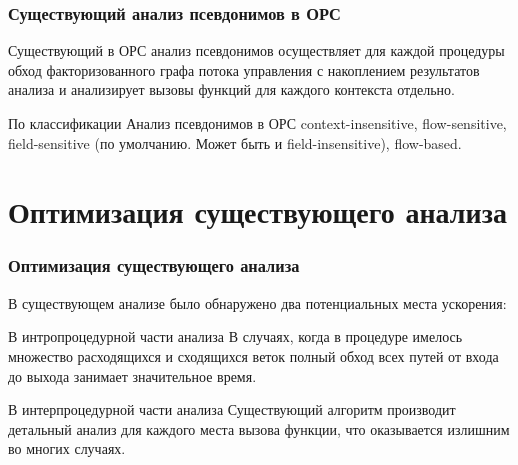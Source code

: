 \documentclass[utf8,russian]{beamer}
\begin{document}
\begin{frame}
\frametitle{Существующий анализ псевдонимов в ОРС}

\begin{block}{}
Существующий в ОРС анализ псевдонимов осуществляет для каждой процедуры обход факторизованного графа потока управления с накоплением результатов анализа и анализирует вызовы функций для каждого контекста отдельно.
\end{block}

\begin{block}{По классификации}
Анализ псевдонимов в ОРС context-insensitive, flow-sensitive, field-sensitive (по умолчанию. Может быть и field-insensitive), flow-based.
\end{block}

\end{frame}

\section{Оптимизация существующего анализа}

\begin{frame}
\frametitle{Оптимизация существующего анализа}

\begin{block}{}
В существующем анализе было обнаружено два потенциальных места ускорения:
\end{block}

\begin{block}{В интропроцедурной части анализа}
В случаях, когда в процедуре имелось множество расходящихся и сходящихся веток полный обход всех путей от входа до выхода занимает значительное время.
\end{block}

\begin{block}{В интерпроцедурной части анализа}
Существующий алгоритм производит детальный анализ для каждого места вызова функции, что оказывается излишним во многих случаях.
\end{block}

\end{frame}

\end{document}

